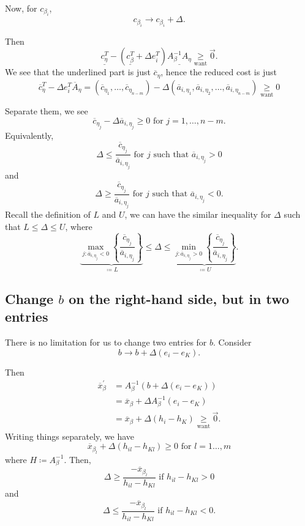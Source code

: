 Now, for \(c_{\beta_{i}}\),
\[
	c_{\beta_{i}}\to c_{\beta_{i}}+\Delta.
\]

Then
\[
	\underline{c_{\eta}^{T}} - (\underline{c_{\beta}^{T}} + \Delta e_{i}^{T}) \underline{A^{-1}_{\beta}A_{\eta}}\underset{\text{want}}{\geq} \vec{0}.
\]
We see that the underlined part is just \(\overline{c}_{\eta}\), hence the reduced cost is just
\[
	\overline{c}_{\eta}^{T} - \Delta e_{i}^{T}\overline{A}_{\eta} = (\overline{c}_{\eta_1}, \ldots , \overline{c}_{\eta_{n-m}}) - \Delta(\overline{a}_{i, \eta_1}, \overline{a}_{i, \eta_2}, \ldots , \overline{a}_{i, \eta_{n-m}})\underset{\text{want}}{\geq} 0
\]

Separate them, we see
\[
	\overline{c}_{\eta_{j}} - \Delta \overline{a}_{i, \eta_{j}} \geq 0 \text{ for }j = 1, \ldots , n-m.
\]
Equivalently,
\[
	\Delta\leq \frac{\overline{c}_{\eta_{j}}}{\overline{a}_{i, \eta_{j}}} \text{ for }j \text{ such that }\overline{a}_{i, \eta_{j}}>0
\]
and
\[
	\Delta\geq \frac{\overline{c}_{\eta_{j}}}{\overline{a}_{i, \eta_{j}}} \text{ for }j \text{ such that }\overline{a}_{i, \eta_{j}}<0.
\]
Recall the definition of \(L\) and \(U\), we can have the similar inequality for \(\Delta\) such that \(L\leq \Delta\leq U\), where
\[
	\underbrace{\max_{j\colon \overline{a}_{i, \eta_{j}} < 0}\left\{ \frac{\overline{c}_{\eta_{j}}}{\overline{a}_{i, \eta_{j}}} \right\}}_{\coloneqq L} \leq \Delta \leq \underbrace{\min_{j\colon \overline{a}_{i, \eta_{j}} > 0}\left\{ \frac{\overline{c}_{\eta_{j}}}{\overline{a}_{i, \eta_{j}}} \right\}}_{\coloneqq U}.
\]

\subsection{Change \(b\) on the right-hand side, but in two entries}
There is no limitation for us to change two entries for \(b\). Consider
\[
	b\to b+\Delta(e_{i} - e_{K}).
\]

Then
\[
	\begin{split}
		\overline{x}_{\beta}^\prime &= A_{\beta}^{-1}(b+\Delta(e_{i} - e_K))\\
		&= \overline{x}_{\beta}+\Delta A^{-1}_{\beta}(e_{i} - e_K)\\
		&= \overline{x}_{\beta}+\Delta(h_{i} - h_K)\underset{\text{want}}{\geq} \vec{0}.
	\end{split}
\]
Writing things separately, we have
\[
	\overline{x}_{\beta_l} + \Delta(h_{il} - h_{Kl}) \geq 0 \text{ for }l = 1\ldots , m
\]
where \(H\coloneqq A^{-1}_{\beta}\).
Then,
\[
	\Delta\geq \frac{-\overline{x}_{\beta_l}}{h_{il} - h_{Kl}} \text{ if }h_{il} - h_{Kl} > 0
\]
and
\[
	\Delta\leq \frac{-\overline{x}_{\beta_l}}{h_{il} - h_{Kl}} \text{ if }h_{il} - h_{Kl} < 0.
\]

